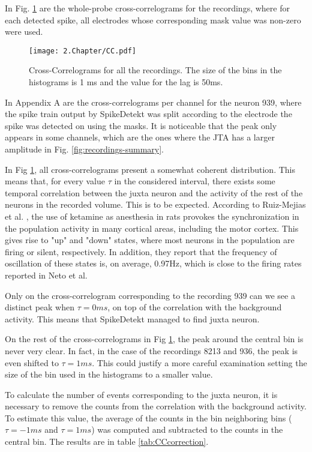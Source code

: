In Fig. \ref{fig:CC} are the whole-probe cross-correlograms for the recordings, where for each detected spike, all electrodes whose corresponding mask value was non-zero were used.

\begin{figure}[!h]
	\centering
	\texttt{[image: 2.Chapter/CC.pdf]}
	\caption{Cross-Correlograms for all the recordings. The size of the bins in the histograms is 1 ms and the value for the lag is 50ms.
}
\label{fig:CC}
\end{figure}

In Appendix A are the cross-correlograms per channel for the neuron 939, where the spike train output by SpikeDetekt was split according to the electrode the spike was detected on using the masks. It is noticeable that the peak only appears in some channels, which are the ones where the JTA has a larger amplitude in Fig. \ref{fig:recordings-summary}.

In Fig \ref{fig:CC}, all cross-correlograms present a somewhat coherent distribution. This means that, for every value $\tau$ in the considered interval, there exists some temporal correlation between the juxta neuron and the activity of the rest of the neurons in the recorded volume. This is to be expected. According to Ruiz-Mejias et al. \cite{ruiz2011slow}, the use of ketamine as anesthesia in rats provokes the synchronization in the population activity in many cortical areas, including the motor cortex. This gives rise to "up" and "down" states, where most neurons in the population are firing or silent, respectively. In addition, they report that the frequency of oscillation of these states is, on average, 0.97Hz, which is close to the firing rates reported in Neto et al. 

Only on the cross-correlogram corresponding to the recording 939 can we see a distinct peak when $\tau=0 ms$, on top of the correlation with the background activity. This means that SpikeDetekt managed to find juxta neuron.

On the rest of the cross-correlograms in Fig \ref{fig:CC}, the peak around the central bin is never very clear. In fact, in the case of the recordings 8213 and 936, the peak is even shifted to $\tau=1 ms$. This could justify a more careful examination setting the size of the bin used in the histograms to a smaller value.

To calculate the number of events corresponding to the juxta neuron, it is necessary to remove the counts from the correlation with the background activity. To estimate this value, the average of the counts in the bin neighboring bins ($\tau = -1ms$ and $\tau = 1 ms$) was computed and subtracted to the counts in the central bin. The results are in table \ref{tab:CCcorrection}.

